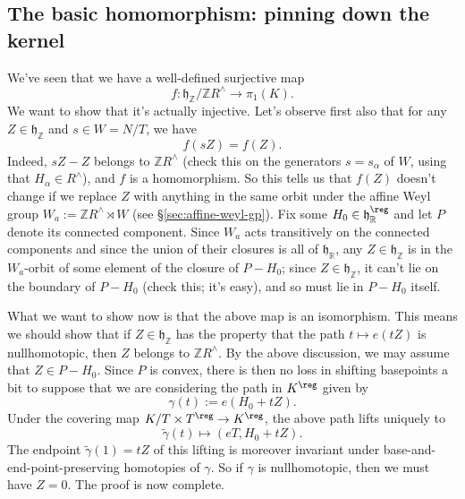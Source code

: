 \documentclass[reqno]{amsart} 
\begin{document}
\subsection{The basic homomorphism: pinning down the kernel}
\label{sec:org8c8e428}
We've seen that we have a well-defined surjective map
\begin{equation*}
  f : \mathfrak{h}_\mathbb{Z} / \mathbb{Z} R^\wedge \rightarrow \pi_1(K).
\end{equation*}
We want to show that it's actually injective.  Let's observe first also that for any $Z \in \mathfrak{h}_\mathbb{Z}$ and $s \in W = N/T$, we have
\begin{equation*}
  f(s Z) = f(Z).
\end{equation*}
Indeed, $s Z - Z$ belongs to $\mathbb{Z} R^\wedge$ (check this on the generators $s = s_\alpha$ of $W$, using that $H_\alpha \in R^\wedge$), and $f$ is a homomorphism.  So this tells us that $f(Z)$ doesn't change if we replace $Z$ with anything in the same orbit under the affine Weyl group $W_a := \mathbb{Z} R^\wedge \rtimes W$ (see \S\ref{sec:affine-weyl-gp}).  Fix some $H_0 \in \mathfrak{h}_{\mathbb{R}}^{\reg}$ and let $P$ denote its connected component.  Since $W_a$ acts transitively on the connected components and since the union of their closures is all of $\mathfrak{h}_\mathbb{R}$, any $Z \in \mathfrak{h}_\mathbb{Z}$ is in the $W_a$-orbit of some element of the closure of $P - H_0$; since $Z \in \mathfrak{h}_\mathbb{Z}$, it can't lie on the boundary of $P - H_0$ (check this; it's easy), and so must lie in $P - H_0$ itself.

What we want to show now is that the above map is an isomorphism.  This means we should show that if $Z \in \mathfrak{h}_\mathbb{Z}$ has the property that the path $t \mapsto e(t Z)$ is nullhomotopic, then $Z$ belongs to $\mathbb{Z} R^\wedge$.  By the above discussion, we may assume that $Z \in P - H_0$.  Since $P$ is convex, there is then no loss in shifting basepoints a bit to suppose that we are considering the path in $K^{\reg}$ given by
\begin{equation*}
  \gamma(t) := e(H_0 + t Z).
\end{equation*}
Under the covering map $K/T \times T^{\reg} \rightarrow K^{\reg}$, the above path lifts uniquely to
\begin{equation*}
  \tilde{\gamma}(t) \mapsto (e T, H_0 + t Z).
\end{equation*}
The endpoint $\tilde{\gamma}(1) = t Z$ of this lifting is moreover invariant under base-and-end-point-preserving homotopies of $\gamma$.  So if $\gamma$ is nullhomotopic, then we must have $Z = 0$.  The proof is now complete.


{} 
\end{document}
